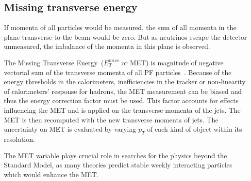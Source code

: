 \subsection{Missing transverse energy}


If momenta of all particles would be measured, the sum of all momenta in the plane transverse to the beam would be zero. But as neutrinos escape the detector unmeasured, the imbalance of the momenta in this plane is observed. 

The Missing Transverse Energy~($E_{T}^{miss}$ or MET) is magnitude of negative vectorial sum of the transverse momenta of all PF particles~\cite{CMS:2016ljj}. Because of the energy thresholds in the calorimeters, inefficiencies in the tracker or non-linearity of calorimeters' response for hadrons, the MET measurement can be biased and thus the energy correction factor must be used. This factor accounts for effects influencing the MET and is applied on the transverse momenta of the jets. The MET is then recomputed with the new transverse momenta of jets. The uncertainty on MET is evaluated by varying $p_{T}$ of each kind of object within its resolution. 

The MET variable plays crucial role in searches for the physics beyond the Standard Model, as many theories predict stable weekly interacting particles which would enhance the MET.
